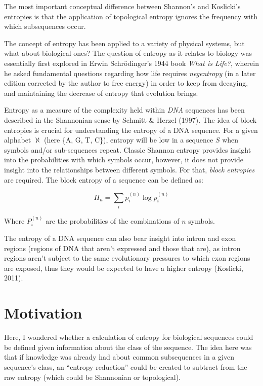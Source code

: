 \documentclass[11pt, letterpaper, twocolumn]{article}
\begin{document}
  The most important conceptual difference between Shannon's and Koslicki's entropies is that the application of topological entropy ignores the frequency with which subsequences occur.
  
  The concept of entropy has been applied to a variety of physical systems, but what about
  biological ones? The question of entropy as it relates to biology was
  essentially first explored in Erwin Schrödinger's 1944 book \emph{What is
  Life?}, wherein he asked fundamental questions regarding how life requires
  \emph{negentropy} (in a later edition corrected by the author to free energy)
  in order to keep from decaying, and maintaining the decrease of entropy that evolution brings.

  Entropy as a measure of the complexity held within \emph{DNA} sequences has been described
  in the Shannonian sense by Schmitt \& Herzel (1997). The idea of block
  entropies is crucial for understanding the entropy of a DNA sequence. For a
  given alphabet $\aleph$ (here \{A, G, T, C\}), entropy will be low in
  a sequence $S$ when symbols and/or sub-sequences repeat. Classic Shannon
  entropy provides insight into the probabilities with which symbols occur,
  however, it does not provide insight into the relationships between different
  symbols. For that, \emph{block entropies} are required. The block entropy of a sequence can be defined as:

  \begin{equation}
    H_{n}= \sum _{i}p_{i}^{(n)}\log p_{i}^{(n)}
  \end{equation}

  Where $P_{i}^{(n)}$ are the probabilities of the combinations of $n$ symbols.
   
  The entropy of a DNA sequence can also bear insight into intron and exon regions (regions of DNA that aren't expressed and those that are), as intron regions aren't subject to the same evolutionary pressures to which exon regions are exposed, thus they would be expected to have a higher entropy (Koslicki, 2011).
  
  \section{Motivation}
   Here, I wondered whether a calculation of entropy for biological sequences could be defined given information about the class of the sequence. The idea here was that if knowledge was already had about common subsequences in a given sequence's class, an ``entropy reduction'' could be created to subtract from the raw entropy (which could be Shannonian or topological).
   
\end{document}
